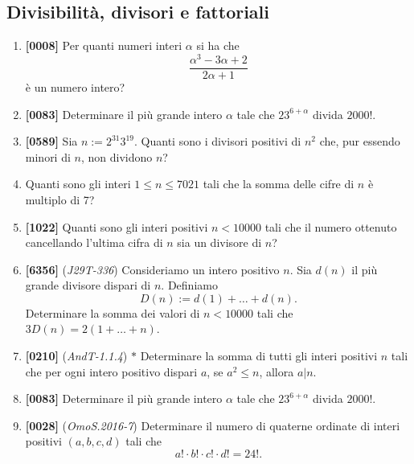 \documentclass[10pt]{article}
\begin{document}
\subsection{Divisibilità, divisori e fattoriali}
\begin{enumerate}
    \item \textbf{[0008]} Per quanti numeri interi $\alpha$ si ha che
    \begin{equation*}
        \frac{\alpha^3-3\alpha+2}{2\alpha+1}
    \end{equation*}
    è un numero intero?

    \item \textbf{[0083]} Determinare il più grande intero $\alpha$ tale che $23^{6+\alpha}$ divida $2000!$.

    \item \textbf{[0589]} Sia $n:=2^{31}3^{19}$. Quanti sono i divisori positivi di $n^2$ che, pur essendo minori di $n$, non dividono $n$?

    \item Quanti sono gli interi $1\le n \le 7021$ tali che la somma delle cifre di $n$ è multiplo di 7?

    \item \textbf{[1022]} Quanti sono gli interi positivi $n<10000$ tali che il numero ottenuto cancellando l'ultima cifra di $n$ sia un divisore di $n$?

    \item \textbf{[6356]} (\textit{J29T-336}) Consideriamo un intero positivo $n$. Sia $d(n)$ il più grande divisore dispari di $n$. Definiamo
    \begin{equation*}
        D(n):=d(1)+\dots+d(n).
    \end{equation*}
    Determinare la somma dei valori di $n<10000$ tali che $3D(n)=2(1+\dots+n)$.

    \item \textbf{[0210]} (\textit{AndT-1.1.4}) $\ast$ Determinare la somma di tutti gli interi positivi $n$ tali che per ogni intero positivo dispari $a$, se $a^2\le n$, allora $a|n$.

    \item \textbf{[0083]} Determinare il più grande intero $\alpha$ tale che $23^{6+\alpha}$ divida $2000!$.

    \item \textbf{[0028]} (\textit{OmoS.2016-7}) Determinare il numero di quaterne ordinate di interi positivi $(a,b,c,d)$ tali che
    \begin{equation*}
        a!\cdot b!\cdot c!\cdot d!=24!.
    \end{equation*}
    
\end{enumerate}
\end{document}
